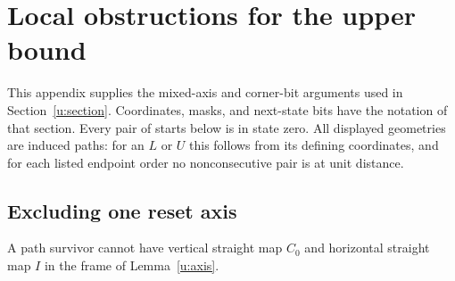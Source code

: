 \section{Local obstructions for the upper bound}\label{u:appendix}

This appendix supplies the mixed-axis and corner-bit arguments used
in Section~\ref{u:section}. Coordinates, masks, and next-state bits
have the notation of that section. Every pair of starts below is
in state zero. All displayed geometries are induced paths: for an
$L$ or $U$ this follows from its defining coordinates, and for each
listed endpoint order no nonconsecutive pair is at unit distance.

\subsection{Excluding one reset axis}\label{u:appendix-mixed}

\begin{lemma}\label{u:mixed0}
A path survivor cannot have vertical straight map $C_0$ and
horizontal straight map $I$ in the frame of Lemma~\ref{u:axis}.
\end{lemma}

